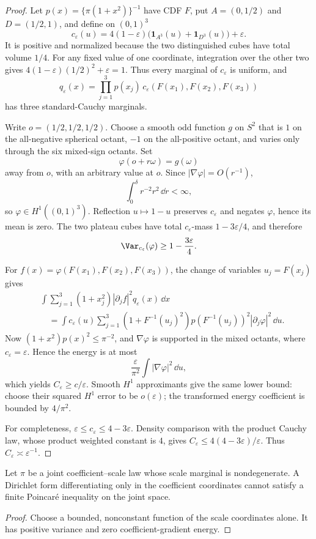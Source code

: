 \documentclass[../main.tex]{subfiles}
\begin{document}
\begin{proof}
Let $p(x)=\{\pi(1+x^2)\}^{-1}$ have CDF $F$, put $A=(0,1/2)$ and $D=(1/2,1)$, and define on
$(0,1)^3$
\[
 c_\varepsilon(u)
 =4(1-\varepsilon)\bigl(\mathbf1_{A^3}(u)+\mathbf1_{D^3}(u)\bigr)+\varepsilon.
\]
It is positive and normalized because the two distinguished cubes have total volume $1/4$.
For any fixed value of one coordinate, integration over the other two gives
$4(1-\varepsilon)(1/2)^2+\varepsilon=1$. Thus every marginal of $c_\varepsilon$ is uniform, and
\[
 q_\varepsilon(x)
 =\prod_{j=1}^3p(x_j)\,
   c_\varepsilon(F(x_1),F(x_2),F(x_3))
\]
has three standard-Cauchy marginals.

Write $o=(1/2,1/2,1/2)$. Choose a smooth odd function $g$ on $S^2$ that is $1$ on the
all-negative spherical octant, $-1$ on the all-positive octant, and varies only through the six
mixed-sign octants. Set
\[
 \varphi(o+r\omega)=g(\omega)
\]
away from $o$, with an arbitrary value at $o$. Since $|\nabla\varphi|=O(r^{-1})$,
\[
 \int_0^\delta r^{-2}r^2\,\dd r<\infty,
\]
so $\varphi\in H^1((0,1)^3)$. Reflection $u\mapsto1-u$ preserves $c_\varepsilon$ and negates
$\varphi$, hence its mean is zero. The two plateau cubes have total
$c_\varepsilon$-mass $1-3\varepsilon/4$, and therefore
\[
 \Var_{c_\varepsilon}(\varphi)\ge1-\frac{3\varepsilon}{4}.
\]

For $f(x)=\varphi(F(x_1),F(x_2),F(x_3))$, the change of variables $u_j=F(x_j)$ gives
\begin{align*}
 &\int\sum_{j=1}^3(1+x_j^2)|\partial_jf|^2q_\varepsilon(x)\,\dd x\\
 &\quad=\int c_\varepsilon(u)\sum_{j=1}^3
 (1+F^{-1}(u_j)^2)p(F^{-1}(u_j))^2|\partial_j\varphi|^2\,\dd u.
\end{align*}
Now $(1+x^2)p(x)^2\le\pi^{-2}$, and $\nabla\varphi$ is supported in the mixed octants, where
$c_\varepsilon=\varepsilon$. Hence the energy is at most
\[
 \frac{\varepsilon}{\pi^2}\int|\nabla\varphi|^2\,\dd u,
\]
which yields $C_\varepsilon\ge c/\varepsilon$. Smooth $H^1$ approximants give the same lower
bound: choose their squared $H^1$ error to be $o(\varepsilon)$; the transformed energy
coefficient is bounded by $4/\pi^2$.

For completeness, $\varepsilon\le c_\varepsilon\le4-3\varepsilon$. Density comparison with the
product Cauchy law, whose product weighted constant is $4$, gives
$C_\varepsilon\le4(4-3\varepsilon)/\varepsilon$. Thus
$C_\varepsilon\asymp\varepsilon^{-1}$.
\end{proof}

\begin{corollary}
Let $\pi$ be a joint coefficient--scale law whose scale marginal is nondegenerate. A Dirichlet
form differentiating only in the coefficient coordinates cannot satisfy a finite Poincar\'e
inequality on the joint space.
\end{corollary}

\begin{proof}
Choose a bounded, nonconstant function of the scale coordinates alone. It has positive variance
and zero coefficient-gradient energy.
\end{proof}
\end{document}
